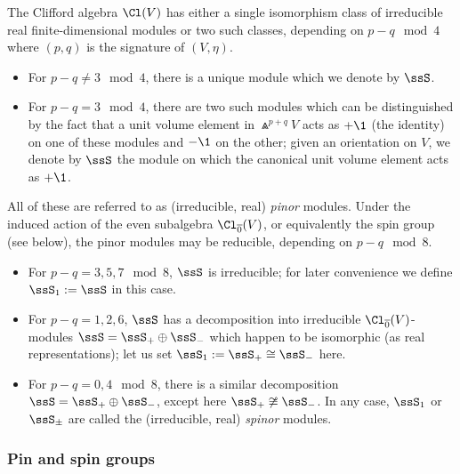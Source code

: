 The Clifford algebra $\Cl(V)$ has either a single isomorphism class of irreducible real finite-dimensional modules or two such classes, depending on $p-q\mod 4$ where $(p,q)$ is the signature of $(V,\eta)$.
\begin{itemize}\itemsep=0pt
	\item For $p-q\neq 3\mod 4$, there is a unique module which we denote by $\ssS$.
	\item For $p-q = 3 \mod 4$, there are two such modules which can be distinguished by the fact that a unit volume element in $\Wedge^{p+q}V$ acts as $+\1$ (the identity) on one of these modules and $-\1$ on the other; given an orientation on $V$, we denote by $\ssS$ the module on which the canonical unit volume element acts as $+\1$.
\end{itemize}
All of these are referred to as (irreducible, real) \emph{pinor} modules. Under the induced action of the even subalgebra $\Cl_{\overline 0}(V)$, or equivalently the spin group (see below), the pinor modules may be reducible, depending on $p-q\mod 8$.
\begin{itemize}\itemsep=0pt
	\item For $p-q=3,5,7 \mod 8$, $\ssS$ is irreducible; for later convenience we define $\ssS_1:=\ssS$ in this case.
	\item For $p-q=1,2,6$, $\ssS$ has a decomposition into irreducible $\Cl_{\overline0}(V)$-modules $\ssS=\ssS_+\oplus\ssS_-$ which happen to be isomorphic (as real representations); let us set $\ssS_1:=\ssS_+\cong\ssS_-$ here.
	\item For $p-q=0,4\mod 8$, there is a similar decomposition $\ssS=\ssS_+\oplus\ssS_-$, except here $\ssS_+\not\cong\ssS_-$. In any case, $\ssS_1$ or $\ssS_\pm$ are called the (irreducible, real) \emph{spinor} modules.
\end{itemize}

\subsubsection{Pin and spin groups}
\label{sec:pin-spin-group}

